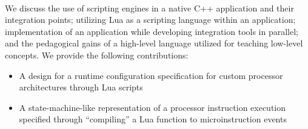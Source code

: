 \paragraph{} We discuss the use of scripting engines in a native C++ application and their integration points; utilizing Lua as a scripting language within an application; implementation of an application while developing integration tools in parallel; and the pedagogical gains of a high-level language utilized for teaching low-level concepts. We provide the following contributions:
\begin{itemize}
    \item A design for a runtime configuration specification for custom processor architectures through Lua scripts
    \item A state-machine-like representation of a processor instruction execution specified through ``compiling'' a Lua function to microinstruction events
\end{itemize}

